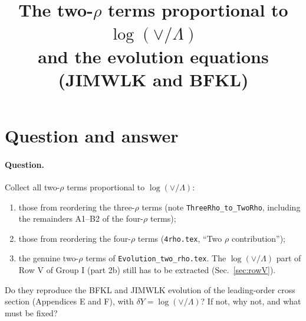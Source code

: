 \documentclass[10pt]{article}
\title{The two-$\rho$ terms proportional to $\log(\vee/\Lambda)$\\[2pt] \large and the evolution equations (JIMWLK and BFKL)}
\date{}
\numberwithin{equation}{section}
\begin{document}
\maketitle
\tableofcontents

\section{Question and answer}\label{sec:answer}

\paragraph{Question.} Collect all two-$\rho$ terms proportional to $\log(\vee/\Lambda)$:
\begin{enumerate}
\item those from reordering the three-$\rho$ terms (note \texttt{ThreeRho\_to\_TwoRho}, including the remainders A1--B2 of the four-$\rho$ terms);
\item those from reordering the four-$\rho$ terms (\texttt{4rho.tex}, ``Two $\rho$ contribution'');
\item the genuine two-$\rho$ terms of \texttt{Evolution\_two\_rho.tex}. The $\log(\vee/\Lambda)$ part of Row V of Group I (part 2b) still has to be extracted (Sec.~\ref{sec:rowV}).
\end{enumerate}
Do they reproduce the BFKL and JIMWLK evolution of the leading-order cross section (Appendices E and F), with $\delta Y=\log(\vee/\Lambda)$? If not, why not, and what must be fixed?
\end{document}
